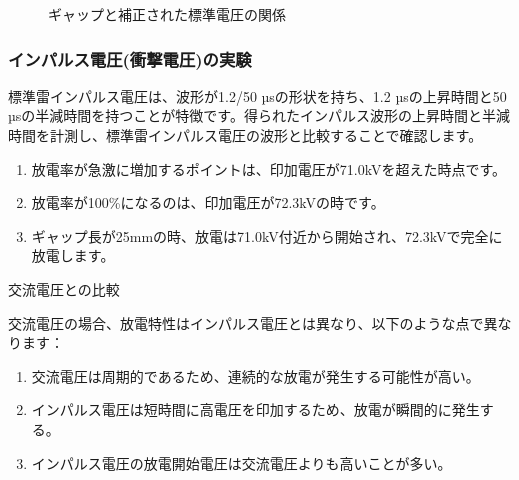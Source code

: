\documentclass[a4paper,11pt,xelatex,ja=standard]{bxjsarticle}
\begin{document}
                \begin{figure}[H]
                    \centering
                    \caption{ギャップと補正された標準電圧の関係}
                \end{figure}
            
            \subsubsection{インパルス電圧(衝撃電圧)の実験}
                標準雷インパルス電圧は、波形が1.2/50 µsの形状を持ち、1.2 µsの上昇時間と50 µsの半減時間を持つことが特徴です。得られたインパルス波形の上昇時間と半減時間を計測し、標準雷インパルス電圧の波形と比較することで確認します。

                \begin{enumerate}
                    \item 放電率が急激に増加するポイントは、印加電圧が71.0kVを超えた時点です。
                    \item 放電率が100\%になるのは、印加電圧が72.3kVの時です。
                    \item ギャップ長が25mmの時、放電は71.0kV付近から開始され、72.3kVで完全に放電します。
                \end{enumerate}
                
                交流電圧との比較
                
                交流電圧の場合、放電特性はインパルス電圧とは異なり、以下のような点で異なります：
                
                \begin{enumerate}
                    \item 交流電圧は周期的であるため、連続的な放電が発生する可能性が高い。
                    \item インパルス電圧は短時間に高電圧を印加するため、放電が瞬間的に発生する。
                    \item インパルス電圧の放電開始電圧は交流電圧よりも高いことが多い。
                \end{enumerate}
                
\end{document}
